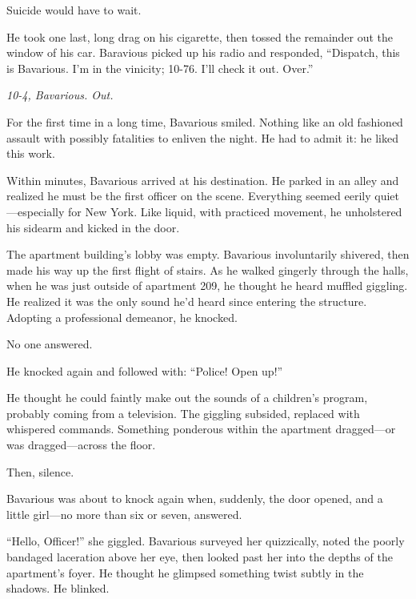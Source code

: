 Suicide would have to wait.



He took one last, long drag on his cigarette, then tossed the
remainder out the window of his car. Baravious picked up his radio
and responded, ``Dispatch, this is Bavarious. I'm in the vinicity;
10-76. I'll check it out. Over.''



{\em 10-4, Bavarious. Out.}



For the first time in a long time, Bavarious smiled. Nothing like
an old fashioned assault with possibly fatalities to enliven the
night. He had to admit it: he liked this work.



Within minutes, Bavarious arrived at his destination. He parked in
an alley and realized he must be the first officer on the scene.
Everything seemed eerily quiet---especially for New York. Like
liquid, with practiced movement, he unholstered his sidearm and
kicked in the door.



The apartment building's lobby was empty. Bavarious involuntarily
shivered, then made his way up the first flight of stairs. As he
walked gingerly through the halls, when he was just outside of
apartment 209, he thought he heard muffled giggling. He realized it
was the only sound he'd heard since entering the structure.
Adopting a professional demeanor, he knocked.



No one answered.



He knocked again and followed with: ``Police! Open up!''



He thought he could faintly make out the sounds of a children's
program, probably coming from a television. The giggling subsided,
replaced with whispered commands. Something ponderous within the
apartment dragged---or was dragged---across the
floor.



Then, silence.



Bavarious was about to knock again when, suddenly, the door opened,
and a little girl---no more than six or seven, answered.



``Hello, Officer!'' she giggled. Bavarious surveyed her quizzically,
noted the poorly bandaged laceration above her eye, then looked
past her into the depths of the apartment's foyer. He thought he
glimpsed something twist subtly in the shadows. He blinked.



